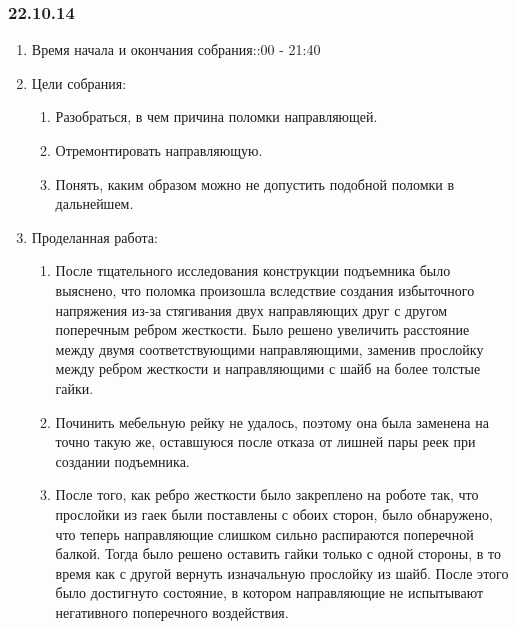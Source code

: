 
\subsubsection{22.10.14}

\begin{enumerate}
	\item Время начала и окончания собрания::00 - 21:40
	\item Цели собрания:\newline
	\begin{enumerate}
	  \item Разобраться, в чем причина поломки направляющей.\newline
	  
	  \item Отремонтировать направляющую.\newline
	  
	  \item Понять, каким образом можно не допустить подобной поломки в дальнейшем.\newline
	  
    \end{enumerate}
    
	\item Проделанная работа:\newline
	\begin{enumerate}
	  \item После тщательного исследования конструкции подъемника было выяснено, что поломка произошла вследствие создания избыточного напряжения из-за стягивания двух направляющих друг с другом поперечным ребром жесткости. Было решено увеличить расстояние между двумя соответствующими направляющими, заменив прослойку между ребром жесткости и направляющими с шайб на более толстые гайки.\newline
      
      \item Починить мебельную рейку не удалось, поэтому она была заменена на точно такую же, оставшуюся после отказа от лишней пары реек при создании подъемника.\newline
      
      \item После того, как ребро жесткости было закреплено на роботе так, что прослойки из гаек были поставлены с обоих сторон, было обнаружено, что теперь направляющие слишком сильно распираются поперечной балкой. Тогда было решено оставить гайки только с одной стороны, в то время как с другой вернуть изначальную прослойку из шайб. После этого было достигнуто состояние, в котором направляющие не испытывают негативного поперечного воздействия.\newline
      

\end{enumerate}
\end{enumerate}
